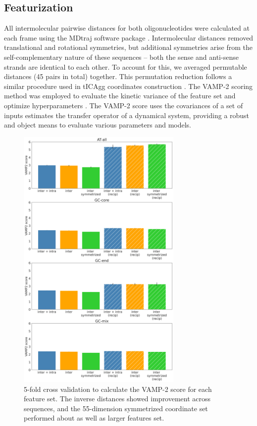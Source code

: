 \documentclass[journal=jpcbfk,manuscript=article]{achemso}
\begin{document}
\subsection{\label{sec:methods}Featurization}

All intermolecular pairwise distances for both oligonucleotides were calculated at each frame using the MDtraj software package \citep{McGibbon2015MDTraj:Trajectories}. Intermolecular distances removed translational and rotational symmetries, but additional symmetries arise from the self-complementary nature of these sequences -- both the sense and anti-sense strands are identical to each other. To account for this, we averaged permutable distances (45 pairs in total) together. This permutation reduction follows a similar procedure used in tICAgg coordinates construction \citep{Sengupta2019AutomatedSelf-assembly}. The VAMP-2 scoring method was employed to evaluate the kinetic variance of the feature set and optimize hyperparameters \citep{WuVariationalData, Mardt2018VAMPnetsKinetics}. The VAMP-2 score uses the covariances of a set of inputs estimates the transfer operator of a dynamical system, providing a robust and object means to evaluate various parameters and models.

\begin{figure}[ht!]
	\begin{center}
        \includegraphics[width=80mm,
        scale=0.5]{Figs/figs_imp/all_permute_vamps_nolegend.png}
        \caption{5-fold cross validation to calculate the VAMP-2 score for each feature set. The inverse distances showed improvement across sequences, and the 55-dimension symmetrized coordinate set performed about as well as larger features set.}
        \label{fig:allseq_features_vamp2}
	\end{center}
\end{figure}
\end{document}
